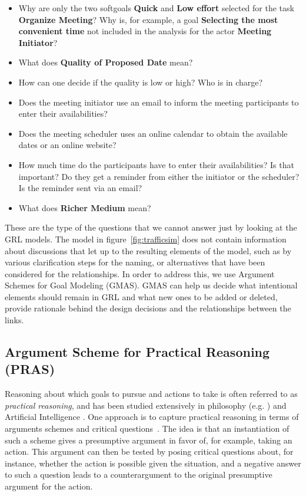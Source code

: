 \begin{itemize}
	\item Why are only the two softgoals \textbf{Quick} and \textbf{Low effort} selected for the task \textbf{Organize Meeting}? Why is, for example, a goal \textbf{Selecting the most convenient time} not included in the analysis for the actor \textbf{Meeting Initiator}?
	\item What does \textbf{Quality of Proposed Date} mean?
	\item How can one decide if the quality is low or high? Who is in charge? 
	\item Does the meeting initiator use an email to inform the meeting participants to enter their availabilities? 
	\item Does the meeting scheduler uses an online calendar to obtain the available dates or an online website?
	\item How much time do the participants have to enter their availabilities? Is that important? Do they get a reminder from either the initiator or the scheduler? Is the reminder sent via an email? 
	\item What does \textbf{Richer Medium} mean? 
\end{itemize}

These are the type of the questions that we cannot answer just by looking at the GRL models. The model in figure~\ref{fig:trafficsim} does not contain information about discussions that let up to the resulting elements of the model, such as by various clarification steps for the naming, or alternatives that have been considered for the relationships. In order to address this, we use Argument Schemes for Goal Modeling (GMAS). GMAS can help us decide what intentional elements should remain in GRL and what new ones to be added or deleted, provide rationale behind the design decisions and the relationships between the links. 

\subsection{Argument Scheme for Practical Reasoning (PRAS)}
\label{sect:background:pras}

Reasoning about which goals to pursue and actions to take is often referred to as \emph{practical reasoning}, and has been studied extensively in philosophy (e.g. \cite{Raz1978-RAZPR,walton1990}) and Artificial Intelligence \cite{Bratman1987,atkinson2007}. One approach is to capture practical reasoning in terms of arguments schemes and critical questions~\cite{walton1990}. The idea is that an instantiation of such a scheme gives a presumptive argument in favor of, for example, taking an action. This argument can then be tested by posing critical questions about, for instance, whether the action is possible given the situation, and a negative answer to such a question leads to a counterargument to the original presumptive argument for the action. 

